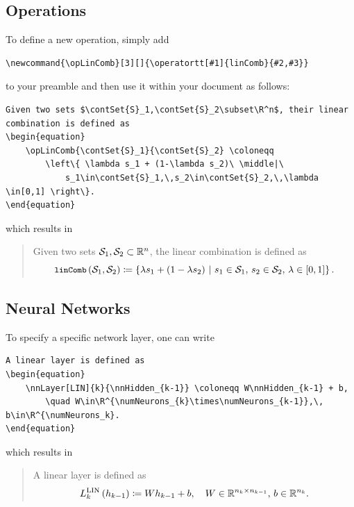\documentclass{article}
\begin{document}
\subsection{Operations}
To define a new operation, simply add
\newcommand{\opLinComb}[3][]{\operatortt[#1]{linComb}{#2,#3}}
\begin{verbatim}
\newcommand{\opLinComb}[3][]{\operatortt[#1]{linComb}{#2,#3}}
\end{verbatim}
to your preamble and then use it within your document as follows:
\begin{verbatim}
Given two sets $\contSet{S}_1,\contSet{S}_2\subset\R^n$, their linear combination is defined as
\begin{equation}
    \opLinComb{\contSet{S}_1}{\contSet{S}_2} \coloneqq
        \left\{ \lambda s_1 + (1-\lambda s_2)\ \middle|\
            s_1\in\contSet{S}_1,\,s_2\in\contSet{S}_2,\,\lambda \in[0,1] \right\}.
\end{equation}
\end{verbatim}
which results in
\begin{quote}
  Given two sets $\contSet{S}_1,\contSet{S}_2\subset\R^n$, the linear combination is defined as
  \begin{equation}
    \opLinComb{\contSet{S}_1}{\contSet{S}_2} \coloneqq
    \left\{ \lambda s_1 + (1-\lambda s_2)\ \middle|\
    s_1\in\contSet{S}_1,\,s_2\in\contSet{S}_2,\,\lambda \in[0,1] \right\}.
  \end{equation}
\end{quote}

\subsection{Neural Networks}
To specify a specific network layer, one can write
\begin{verbatim}
A linear layer is defined as
\begin{equation}
    \nnLayer[LIN]{k}{\nnHidden_{k-1}} \coloneqq W\nnHidden_{k-1} + b,
        \quad W\in\R^{\numNeurons_{k}\times\numNeurons_{k-1}},\, b\in\R^{\numNeurons_k}.
\end{equation}
\end{verbatim}
which results in
\begin{quote}
  A linear layer is defined as
  \begin{equation}
    \nnLayer[LIN]{k}{\nnHidden_{k-1}} \coloneqq W\nnHidden_{k-1} + b,
    \quad W\in\R^{\numNeurons_{k}\times\numNeurons_{k-1}},\, b\in\R^{\numNeurons_k}.
  \end{equation}
\end{quote}
\end{document}
